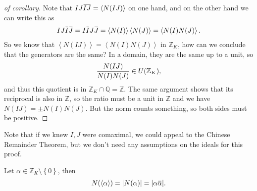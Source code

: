 \begin{proof}[of corollary]

Note that
\(IJ \mkern 1.5mu\overline{\mkern-1.5muIJ\mkern-1.5mu}\mkern 1.5mu = \left\langle{ N(IJ) }\right\rangle\)
on one hand, and on the other hand we can write this as
\begin{align*}
IJ \mkern 1.5mu\overline{\mkern-1.5muI\mkern-1.5mu}\mkern 1.5mu \mkern 1.5mu\overline{\mkern-1.5muJ\mkern-1.5mu}\mkern 1.5mu = I\mkern 1.5mu\overline{\mkern-1.5muI\mkern-1.5mu}\mkern 1.5mu J \mkern 1.5mu\overline{\mkern-1.5muJ\mkern-1.5mu}\mkern 1.5mu = \left\langle{ N(I) }\right\rangle \left\langle{ N(J) }\right\rangle = \left\langle{ N(I) N(J) }\right\rangle
.\end{align*}
So we know that
\(\left\langle{ N(IJ) }\right\rangle = \left\langle{ N(I) N(J) }\right\rangle\)
in \({\mathbb{Z}}_K\), how can we conclude that the generators are the
same? In a domain, they are the same up to a unit, so
\begin{align*}
{ N(IJ) \over N(I) N(J) } \in U({\mathbb{Z}}_K)
,\end{align*}
and thus this quotient is in
\({\mathbb{Z}}_K \cap{\mathbb{Q}}= {\mathbb{Z}}\). The same argument
shows that its reciprocal is also in \({\mathbb{Z}}\), so the ratio must
be a unit in \({\mathbb{Z}}\) and we have \(N(IJ) = \pm N(I) N(J)\). But
the norm counts something, so both sides must be positive.

\end{proof}

\begin{remark}

Note that if we knew \(I, J\) were comaximal, we could appeal to the
Chinese Remainder Theorem, but we don't need any assumptions on the
ideals for this proof.

\end{remark}

\begin{corollary}

Let \(\alpha\in {\mathbb{Z}}_K \setminus\left\{{0}\right\}\), then
\begin{align*}
N( \left\langle{ \alpha }\right\rangle ) = {\left\lvert {N(\alpha)} \right\rvert}  = {\left\lvert {\alpha\mkern 1.5mu\overline{\mkern-1.5mu\alpha\mkern-1.5mu}\mkern 1.5mu} \right\rvert} 
.\end{align*}

\end{corollary}

